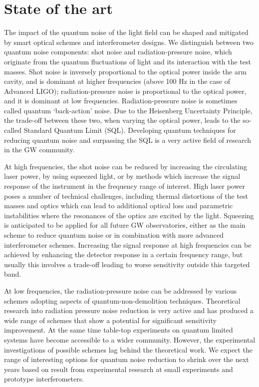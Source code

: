\section{State of the art}
The impact of the quantum noise of the light field can be shaped and mitigated by smart optical schemes and interferometer designs. We distinguish between two quantum noise components: shot noise and radiation-pressure noise, which originate from the quantum fluctuations of light and its interaction with the test masses. Shot noise is inversely proportional to the optical power inside the arm cavity, and is dominant at higher frequencies (above 100 Hz in the case of Advanced LIGO); radiation-pressure noise is proportional to the optical power, and it is dominant at low frequencies. Radiation-pressure noise is sometimes called quantum `back-action' noise. Due to the Heisenberg Uncertainty Principle, the trade-off between these two, when varying the optical power, leads to the so-called Standard Quantum Limit (SQL). Developing quantum techniques for reducing quantum noise and surpassing the SQL is a very active field of research in the GW community. 

At high frequencies, the shot noise can be reduced by increasing the circulating laser power, by using squeezed light, or by methods which increase the signal response of the instrument in the frequency range of interest. High laser power poses a number of technical challenges, including thermal distortions of the test masses and optics which can lead to additional optical loss and parametric instabilities where the resonances of the optics are excited by the light. Squeezing is anticipated to be applied for all future GW observatories, either as the main scheme to reduce quantum noise or in combination with more advanced interferometer schemes. Increasing the signal response at high frequencies can be achieved by enhancing the detector response in a certain frequency range, but usually this involves a trade-off leading to worse sensitivity outside this targeted band.  

At low frequencies, the radiation-pressure noise can be addressed by various schemes adopting aspects of quantum-non-demolition techniques. Theoretical research into radiation pressure noise reduction is very active and has produced a wide range of schemes that show a potential for significant sensitivity improvement. At the same time table-top experiments on quantum limited systems have become accessible to a wider community. However, the experimental investigations of possible schemes lag behind the theoretical work. We expect the range of interesting options for quantum noise reduction to shrink over the next years based on result from experimental research at small experiments and prototype interferometers.


